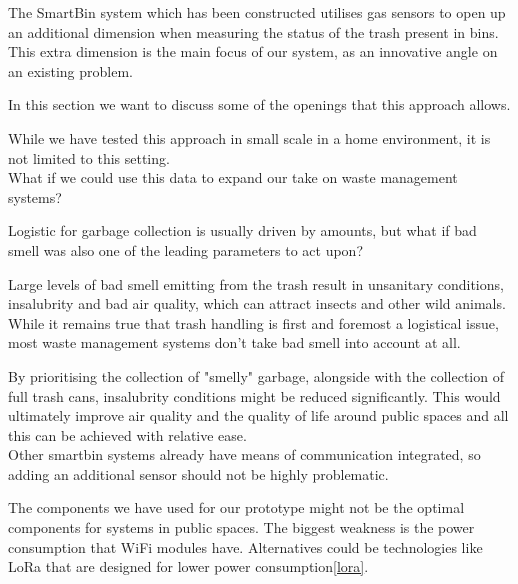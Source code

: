 \iffalse
discussion

here emphasize  about the famous What IF question

take this INNOVATIVE aspect and use it in waste management

in the conclusion:
we can build it, it works, the technology is out there
in the discussion:
it can be applied somewhere else
it can extend other systems
used for innovation
it's a different take
\fi

The SmartBin system which has been constructed utilises gas sensors to open up an additional dimension when measuring the status of the trash present in bins.
This extra dimension is the main focus of our system, as an innovative angle on an existing problem.

In this section we want to discuss some of the openings that this approach allows.

While we have tested this approach in small scale in a home environment, it is not limited to this setting.\\
What if we could use this data to expand our take on waste management systems?

Logistic for garbage collection is usually driven by amounts, but what if bad smell was also one of the leading parameters to act upon?

Large levels of bad smell emitting from the trash result in unsanitary conditions, insalubrity and bad air quality, which can attract insects and other wild animals.
While it remains true that trash handling is first and foremost a logistical issue, most waste management systems don't take bad smell into account at all.

By prioritising the collection of "smelly" garbage, alongside with the collection of full trash cans, insalubrity conditions might be reduced significantly.
This would ultimately improve air quality and the quality of life around public spaces and all this can be achieved with relative ease.\\
Other smartbin systems already have means of communication integrated, so adding an additional sensor should not be highly problematic.

The components we have used for our prototype might not be the optimal components for systems in public spaces.
The biggest weakness is the power consumption that WiFi modules have. Alternatives could be technologies like LoRa that are designed for lower power consumption\ref{lora}.
 

